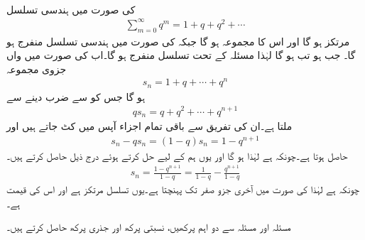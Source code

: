 \quad {}\\
 کی صورت میں ہندسی تسلسل
\begin{align*}
\sum_{m=0}^{\infty} q^m=1+q+q^2+\cdots
\end{align*}
مرتکز ہو گا اور اس کا مجموعہ  ہو گا جبکہ  کی صورت میں ہندسی تسلسل منفرج ہو گا۔ 
\quad
جب  ہو تب  ہو گا لہٰذا مسئلہ  کے تحت تسلسل منفرج ہو گا۔اب   کی صورت میں  واں جزوی مجموعہ
\begin{align*}
s_n=1+q+\cdots+q^n
\end{align*}
ہو گا جس کو  سے ضرب دینے سے
\begin{align*}
qs_n=q+q^2+\cdots+q^{n+1}
\end{align*}
ملتا ہے۔ان کی تفریق سے  باقی تمام اجزاء  آپس میں کٹ جاتے ہیں اور
\begin{align*}
s_n-qs_n=(1-q)s_n=1-q^{n+1}
\end{align*}
حاصل ہوتا ہے۔چونکہ  ہے لہٰذا  ہو گا اور یوں ہم  کے لیے حل کرتے ہوئے درج ذیل حاصل کرتے ہیں۔
\begin{align}
s_n=\frac{1-q^{n+1}}{1-q}=\frac{1}{1-q}-\frac{q^{n+1}}{1-q}
\end{align}
چونکہ  ہے لہٰذا  کی صورت میں  آخری جزو صفر تک پہنچتا ہے۔یوں تسلسل مرتکز ہے اور اس کی قیمت  ہے۔ 

مسئلہ  اور مسئلہ  سے دو اہم پرکھیں، نسبتی پرکھ اور جذری پرکھ حاصل کرتے ہیں۔

